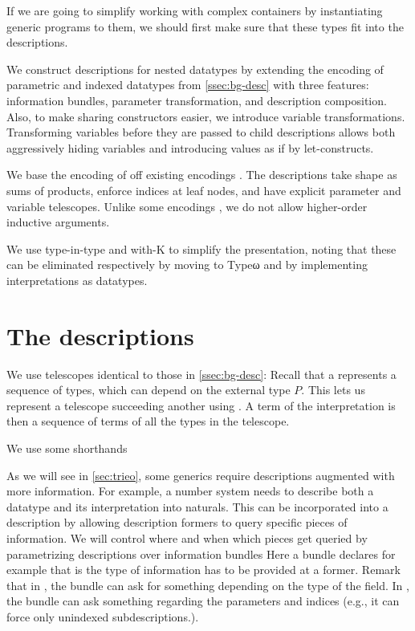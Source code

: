 If we are going to simplify working with complex containers %
by instantiating generic programs to them, we should first make sure that these types fit into the descriptions.

We construct descriptions for nested datatypes by extending the encoding of parametric and indexed datatypes from \autoref{ssec:bg-desc} with three features: information bundles, parameter transformation, and description composition. Also, to make sharing constructors easier, we introduce variable transformations. Transforming variables before they are passed to child descriptions allows both aggressively hiding variables and introducing values as if by let-constructs.

We base the encoding of off existing encodings \cite{sijsling,practgen}. The descriptions take shape as sums of products, enforce indices at leaf nodes, and have explicit parameter and variable telescopes. Unlike some encodings \cite{effectfully, practgen}, we do not allow higher-order inductive arguments. 

We use type-in-type and with-K to simplify the presentation, noting that these can be eliminated respectively by moving to Typeω and by implementing interpretations as datatypes.

\section{\added{}The descriptions}\label{ssec:desc}
We use telescopes identical to those in \autoref{ssec:bg-desc}:
Recall that a  represents a sequence of types, which can depend on the external type $P$. This lets us represent a telescope succeeding another using . A term of the interpretation  is then a sequence of terms of all the types in the telescope.

We use some shorthands

As we will see in \autoref{sec:trieo}, some generics require descriptions augmented with more information. For example, a number system needs to describe both a datatype and its interpretation into naturals. This can be incorporated into a description by allowing description formers to query specific pieces of information. We will control where and when which pieces get queried by parametrizing descriptions over information bundles  
Here a bundle declares for example that  is the type of information has to be provided at a  former. Remark that in , the bundle can ask for something depending on the type of the field. In , the bundle can ask something regarding the parameters and indices (e.g., it can force only unindexed subdescriptions.).

